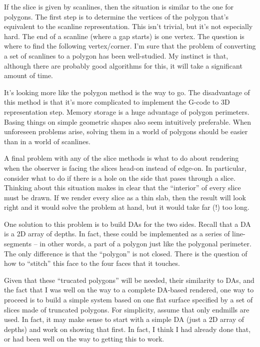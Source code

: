 \documentclass[titlepage,oneside,10pt]{article}
\begin{document}
If the slice is given by scanlines, then the situation is similar to
the one for polygons. The first step is to determine the vertices of
the polygon that's equivalent to the scanline representation. This
isn't trivial, but it's not especially hard. The end of a scanline (where a
gap starts) is one vertex. The question is where to find the following
vertex/corner. I'm sure that the problem of converting a set of
scanlines to a polygon has been well-studied. My instinct is that,
although there are probably good algorithms for this, it will take a
significant amount of time. 

It's looking more like the polygon method is the way to go. The
disadvantage of this method is that it's more complicated to implement
the G-code to 3D representation step. Memory storage is a huge
advantage of polygon perimeters. Basing things on simple geometric
shapes also seem intuitively preferable. When unforeseen problems
arise, solving them in a world of polygons should be easier than in a
world of scanlines.

A final problem with any of the slice methods is what to do about
rendering when the observer is facing the slices head-on instead of
edge-on. In particular, consider what to do if there is a hole on the
side that pases through a slice. Thinking about this situation makes
in clear that the ``interior'' of every slice must be drawn. If we
render every slice as a thin slab, then the result will look right and
it would solve the problem at hand, but it would take far (!) too
long. 

One solution to this problem is to build DAs for the two sides. Recall
that a DA is a 2D array of depths. In fact, these could be implemented
as a series of line-segments -- in other words, a part of a polygon
just like the polygonal perimeter. The only difference is that the
``polygon'' is not closed. There is the question of how to ``stitch''
this face to the four faces that it touches.

Given that these ``trucated polygons'' will be needed, their
similarity to DAs, and the fact that I was well on the way to a
complete DA-based rendered, one way to proceed is to build a simple
system based on one flat surface specified by a set of slices made of
truncated polygons. For simplicity, assume that only endmills are
used. In fact, it may make sense to start with a simple DA (just a 2D
array of depths) and work on showing that first. In fact, I think I
had already done that, or had been well on the way to getting this to
work. 
\end{document}
